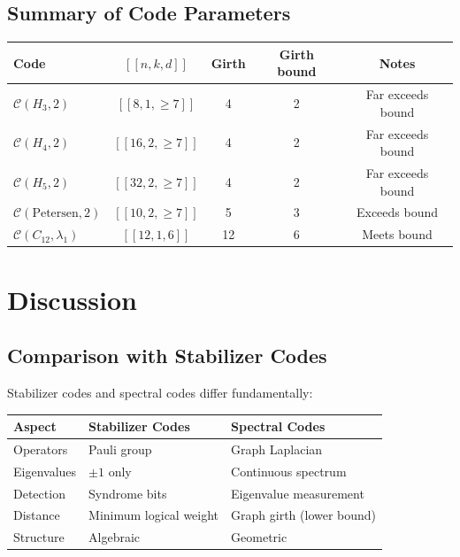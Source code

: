 \documentclass[11pt,a4paper]{article}
\theoremstyle{definition}
\newcommand{\codespace}{\mathcal{C}}
\begin{document}
\subsection{Summary of Code Parameters}

\begin{center}
\begin{tabular}{lcccc}
\toprule
Code & $[[n, k, d]]$ & Girth & Girth bound & Notes \\
\midrule
$\codespace(H_3, 2)$ & $[[8, 1, \geq 7]]$ & 4 & 2 & Far exceeds bound \\
$\codespace(H_4, 2)$ & $[[16, 2, \geq 7]]$ & 4 & 2 & Far exceeds bound \\
$\codespace(H_5, 2)$ & $[[32, 2, \geq 7]]$ & 4 & 2 & Far exceeds bound \\
$\codespace(\text{Petersen}, 2)$ & $[[10, 2, \geq 7]]$ & 5 & 3 & Exceeds bound \\
$\codespace(C_{12}, \lambda_1)$ & $[[12, 1, 6]]$ & 12 & 6 & Meets bound \\
\bottomrule
\end{tabular}
\end{center}

\section{Discussion}
\label{sec:discussion}

\subsection{Comparison with Stabilizer Codes}

Stabilizer codes and spectral codes differ fundamentally:

\begin{center}
\begin{tabular}{lll}
\toprule
Aspect & Stabilizer Codes & Spectral Codes \\
\midrule
Operators & Pauli group & Graph Laplacian \\
Eigenvalues & $\pm 1$ only & Continuous spectrum \\
Detection & Syndrome bits & Eigenvalue measurement \\
Distance & Minimum logical weight & Graph girth (lower bound) \\
Structure & Algebraic & Geometric \\
\bottomrule
\end{tabular}
\end{center}
\end{document}
